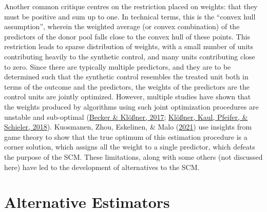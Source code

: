 \documentclass[12pt,nobind, a4paper]{reedthesis}
\begin{document}
 Another common critique centres on the restriction placed on weights: that they must be positive and sum up to one. In technical terms, this is the ``convex hull assumption'', wherein the weighted average (or convex combination) of the predictors of the donor pool falls close to the convex hull of these points. This restriction leads to sparse distribution of weights, with a small number of units contributing heavily to the synthetic control, and many units contributing close to zero. Since there are typically multiple predictors, and they are to be determined such that the synthetic control resembles the treated unit both in terms of the outcome and the predictors, the weights of the predictors are the control units are jointly optimized. However, multiple studies have shown that the weights produced by algorithms using such joint optimization procedures are unstable and sub-optimal (\protect\hyperlink{ref-becker_estimating_2017}{Becker \& Klößner, 2017}; \protect\hyperlink{ref-klosner_comparative_2018}{Klößner, Kaul, Pfeifer, \& Schieler, 2018}). Kuosmanen, Zhou, Eskelinen, \& Malo (\protect\hyperlink{ref-kuosmanen_design_2021}{2021}) use insights from game theory to show that the true optimum of this estimation procedure is a corner solution, which assigns all the weight to a single predictor, which defeats the purpose of the SCM. These limitations, along with some others (not discussed here) have led to the development of alternatives to the SCM.

 \hypertarget{alternative-estimators}{%
 \section{Alternative Estimators}\label{alternative-estimators}}
\end{document}
